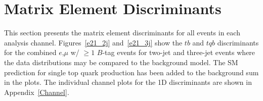 \clearpage
\section{Matrix Element Discriminants}
\label{matrixelementresults}

This section presents the matrix element discriminants for all events in each analysis channel. Figures~\ref{e21_2j} and~\ref{e21_3j} show the $tb$ and $tqb$
discriminants for the combined $e$,$\mu$ w/ $\geq1$ $B$-tag events for two-jet
and three-jet events where the data distributions may be compared to
the background model.  The SM prediction for single top quark
production has been added to the background sum in the plots. The
individual channel plots for the 1D discriminants are shown in
Appendix~\ref{Channel}.

\vspace{-0.05in}
